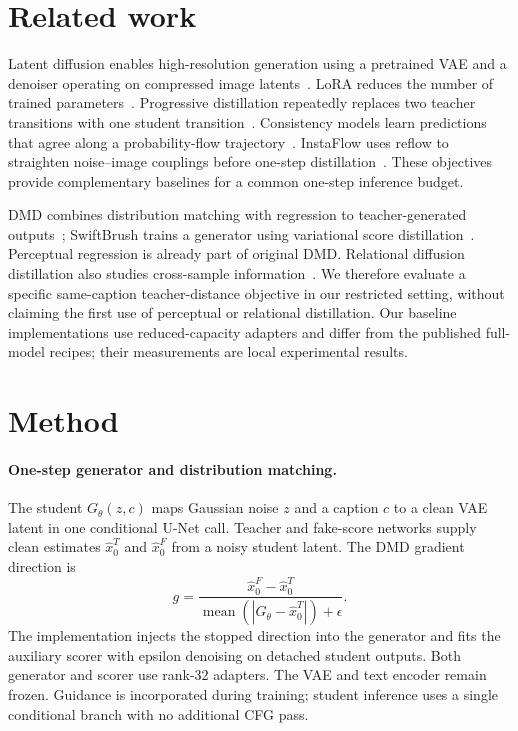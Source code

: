 \documentclass[10pt,twocolumn,letterpaper]{article}
\begin{document}
\section{Related work}
Latent diffusion enables high-resolution generation using a pretrained VAE
and a denoiser operating on compressed image latents~\cite{rombach2022ldm}.
LoRA reduces the number of trained parameters~\cite{hu2022lora}. Progressive
distillation repeatedly replaces two teacher transitions with one student
transition~\cite{salimans2022progressive}. Consistency models learn predictions
that agree along a probability-flow trajectory~\cite{song2023consistency}.
InstaFlow uses reflow to straighten noise--image couplings before one-step
distillation~\cite{liu2024instaflow}. These objectives provide complementary
baselines for a common one-step inference budget.

DMD combines distribution matching with regression to teacher-generated
outputs~\cite{yin2024dmd}; SwiftBrush trains a generator using variational
score distillation~\cite{nguyen2024swiftbrush}. Perceptual regression is
already part of original DMD. Relational diffusion distillation also studies
cross-sample information~\cite{feng2024rdd}. We therefore evaluate a specific
same-caption teacher-distance objective in our restricted setting, without
claiming the first use of perceptual or relational distillation. Our baseline
implementations use reduced-capacity adapters and differ from the published
full-model recipes; their measurements are local experimental results.

\section{Method}
\paragraph{One-step generator and distribution matching.}
The student $G_\theta(z,c)$ maps Gaussian noise $z$ and a caption $c$ to a
clean VAE latent in one conditional U-Net call. Teacher and fake-score
networks supply clean estimates $\hat x_0^T$ and $\hat x_0^F$ from a noisy
student latent. The DMD gradient direction is
\begin{equation}
g=\frac{\hat x_0^F-\hat x_0^T}
 {\operatorname{mean}(|G_\theta-\hat x_0^T|)+\epsilon}.
\end{equation}
The implementation injects the stopped direction into the generator and
fits the auxiliary scorer with epsilon denoising on detached student outputs.
Both generator and scorer use rank-32 adapters. The VAE and text encoder
remain frozen. Guidance is incorporated during training; student inference
uses a single conditional branch with no additional CFG pass.
\end{document}

